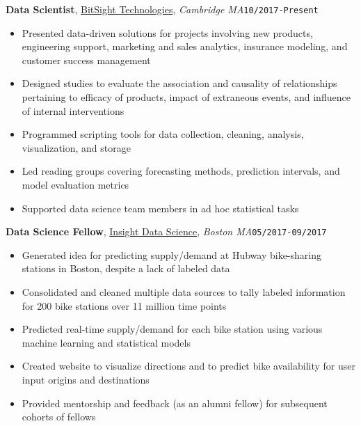 \documentclass[10pt,english]{article}
\begin{document}
\textbf{Data Scientist}, \textcolor{blue}{\href{https://www.bitsighttech.com}{BitSight Technologies}}, \textit{Cambridge
MA}\hfill \texttt{10/2017-Present}
\begin{itemize}
\item Presented data-driven solutions for projects involving new products, engineering support, marketing and sales analytics, insurance modeling, and customer success management
\item Designed studies to evaluate the association and causality of relationships pertaining to efficacy of products, impact of extraneous events, and influence of internal interventions
\item Programmed scripting tools for data collection, cleaning, analysis, visualization, and storage
\item Led reading groups covering forecasting methods, prediction intervals, and model evaluation metrics
\item Supported data science team members in ad hoc statistical tasks
\end{itemize}

\vspace{2mm}

\textbf{Data Science Fellow}, \textcolor{blue}{\href{https://www.insightdatascience.com}{Insight Data Science}}, \textit{Boston
MA}\hfill \texttt{05/2017-09/2017}
\begin{itemize}
\item Generated idea for predicting supply/demand at Hubway bike-sharing stations in Boston, despite a lack of labeled data
\item Consolidated and cleaned multiple data sources to tally labeled information for 200 bike stations over 11 million time points
\item Predicted real-time supply/demand for each bike station using various machine learning and statistical models
\item Created website to visualize directions and to predict bike availability for user input origins and destinations
\item Provided mentorship and feedback (as an alumni fellow) for subsequent cohorts of fellows
\end{itemize}
\end{document}
